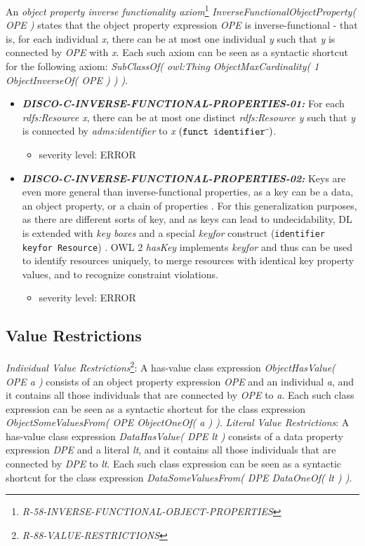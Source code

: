 \documentclass{llncs}
\newcommand{\ms}[1]{\texttt{#1}}
\begin{document}
An \emph{object property inverse functionality axiom}\footnote{\emph{R-58-INVERSE-FUNCTIONAL-OBJECT-PROPERTIES}} \emph{InverseFunctionalObjectProperty( OPE )} states that the object property expression \emph{OPE} is inverse-functional - that is, for each individual \emph{x}, there can be at most one individual \emph{y} such that \emph{y} is connected by \emph{OPE} with \emph{x}. Each such axiom can be seen as a syntactic shortcut for the following axiom: \emph{SubClassOf( owl:Thing ObjectMaxCardinality( 1 ObjectInverseOf( OPE ) ) )}.

\begin{itemize}
	\item \textbf{{\em DISCO-C-INVERSE-FUNCTIONAL-PROPERTIES-01:}}
	For each \emph{rdfs:Resource x}, there can be at most one distinct \emph{rdfs:Resource y} such that \emph{y} is connected by \emph{adms:identifier} to \emph{x} $(\ms{funct identifier}\sp{\overline{\ }})$.
	\begin{itemize}
		\item severity level: ERROR
	\end{itemize}
	\item \textbf{{\em DISCO-C-INVERSE-FUNCTIONAL-PROPERTIES-02:}}
	Keys are even more general than inverse-functional properties,
as a key can be a data, an object property, or a chain of properties \cite{Schneider2009}.
For this generalization purposes, as there are different sorts of key, and as keys can lead to undecidability, 
DL is extended with \emph{key boxes} and a special \emph{keyfor} construct (\ms{identifier \ms{keyfor} Resource}) \cite{Lutz2005}.
OWL 2 \emph{hasKey} implements \emph{keyfor} and thus can be used to identify resources uniquely, to merge resources with identical key property values, and to recognize constraint violations.
	\begin{itemize}
		\item severity level: ERROR
	\end{itemize}
\end{itemize}

\subsection{Value Restrictions}

\emph{Individual Value Restrictions}\footnote{\emph{R-88-VALUE-RESTRICTIONS}}: A has-value class expression \emph{ObjectHasValue( OPE a )} consists of an object property expression \emph{OPE} and an individual \emph{a}, and it contains all those individuals that are connected by \emph{OPE} to \emph{a}. Each such class expression can be seen as a syntactic shortcut for the class expression \emph{ObjectSomeValuesFrom( OPE ObjectOneOf( a ) )}. 
\emph{Literal Value Restrictions}: A has-value class expression \emph{DataHasValue( DPE lt )} consists of a data property expression \emph{DPE} and a literal \emph{lt}, and it contains all those individuals that are connected by \emph{DPE} to \emph{lt}. Each such class expression can be seen as a syntactic shortcut for the class expression \emph{DataSomeValuesFrom( DPE DataOneOf( lt ) )}.
\end{document}
